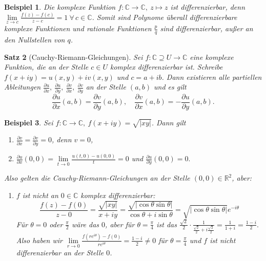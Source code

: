 \documentclass[a4paper,12pt]{book}
\theoremstyle{newthm}
\newtheorem{thm}{Satz}[section]
\theoremstyle{newdef}
\theoremstyle{newrem}
\newtheorem{exmp}[thm]{Beispiel}
\newcommand{\R}{\mathbb{R}}
\newcommand{\C}{\mathbb{C}}
\newcommand{\del}{\partial}
\begin{document}
		\begin{exmp}\label{exmppolyn}
			Die komplexe Funktion $ f: \C \to \C,\ z \mapsto z $ ist differenzierbar, denn $ \lim\limits_{z \to c} \frac{f(z)-f(c)}{z-c} = 1 \ \forall \, c \in \C $. Somit sind Polynome überall differenzierbare komplexe Funktionen und rationale Funktionen $ \frac{p}{q} $ sind differenzierbar, außer an den Nullstellen von $q$.
		\end{exmp}
		
		\begin{thm}[Cauchy-Riemann-Gleichungen]
			Sei $ f: \C \supseteq U \to \C $ eine komplexe Funktion, die an der Stelle $ c \in U $ komplex differenzierbar ist. Schreibe $ f(x+iy) = u(x,y) + iv(x,y) $ und $ c = a+ib $. Dann existieren alle partiellen Ableitungen $ \frac{\del u}{\del x},\ \frac{\del u}{\del y},\ \frac{\del v}{\del x},\ \frac{\del v}{\del y} $ an der Stelle $ (a,b) $ und es gilt 
			$$ \frac{\del u}{\del x}(a,b) = \frac{\del v}{\del y}(a,b),\quad \frac{\del v}{\del x}(a,b) = - \frac{\del u}{\del y}(a,b). $$
		\end{thm}
		
		\begin{exmp}
			Sei $ f:\C \to \C,\ f(x+iy) = \sqrt{|xy|} $. Dann gilt 
			\begin{enumerate}
				\item $ \frac{\del v}{\del x} = \frac{\del v}{\del y} = 0 $, denn $ v = 0 $,
				\item $ \frac{\del u}{\del x}(0,0) = \lim\limits_{t \to 0} \frac{u(t,0) - u(0,0)}{t} = 0 $ und $ \frac{\del u}{\del y}(0,0) = 0. $
			\end{enumerate}
			Also gelten die Cauchy-Riemann-Gleichungen an der Stelle $ (0,0) \in \R^2 $, aber:
			\begin{enumerate}[resume] 
				\item $f$ ist nicht an $ 0 \in \C $ komplex differenzierbar: 
				$$ \frac{f(z) - f(0)}{z-0} = \frac{\sqrt{|xy|}}{x+iy} = \frac{\sqrt{|\cos\theta\sin\theta|}}{\cos\theta + i\sin\theta} = \sqrt{|\cos\theta\sin\theta|}e^{-i\theta} $$
				Für $ \theta = 0 $ oder $ \frac{\pi}{2} $ wäre das $0$, aber für $ \theta = \frac{\pi}{4} $ ist das $ \frac{\sqrt{2}}{2} \cdot \frac{1}{\frac{\sqrt{2}}{2} + i\frac{\sqrt{2}}{2}} = \frac{1}{1+i} = \frac{1-i}{2}. $ Also haben wir $ \lim\limits_{r \to 0} \frac{f(re^{i\theta}) - f(0)}{re^{i\theta}} = \frac{1-i}{2} \neq 0 $ für $ \theta = \frac{\pi}{4} $ und $f$ ist nicht differenzierbar an der Stelle $0$.
			\end{enumerate}
		\end{exmp}
		
\end{document}
